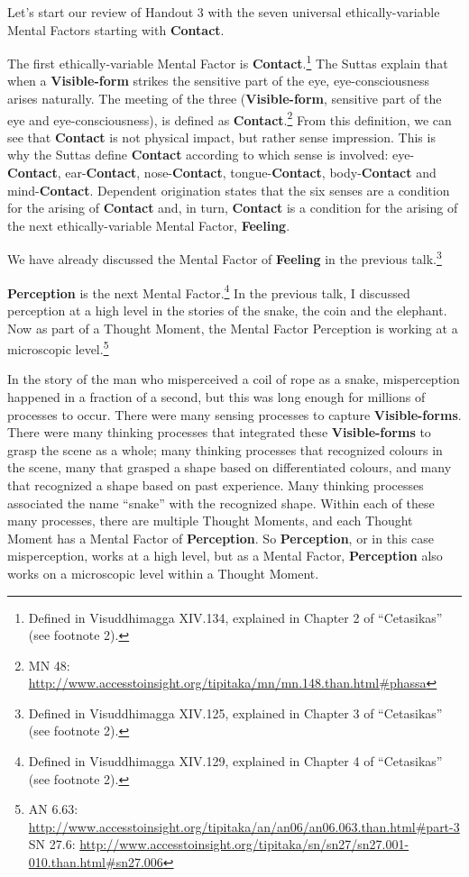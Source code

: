 Let’s start our review of Handout 3 with the seven universal ethically-variable Mental Factors starting with \textbf{Contact}.

The first ethically-variable Mental Factor is \textbf{Contact}.\footnote{Defined in Visuddhimagga XIV.134, explained in Chapter 2 of “Cetasikas” (see footnote 2).} The Suttas explain that when a \textbf{Visible-form} strikes the sensitive part of the eye, eye-consciousness arises naturally. The meeting of the three (\textbf{Visible-form}, sensitive part of the eye and eye-consciousness), is defined as \textbf{Contact}.\footnote{MN 48: \url{http://www.accesstoinsight.org/tipitaka/mn/mn.148.than.html\#phassa}} From this definition, we can see that \textbf{Contact} is not physical impact, but rather sense impression. This is why the Suttas define \textbf{Contact} according to which sense is involved: eye-\textbf{Contact}, ear-\textbf{Contact}, nose-\textbf{Contact}, tongue-\textbf{Contact}, body-\textbf{Contact} and mind-\textbf{Contact}. Dependent origination states that the six senses are a condition for the arising of \textbf{Contact} and, in turn, \textbf{Contact} is a condition for the arising of the next ethically-variable Mental Factor, \textbf{Feeling}.

We have already discussed the Mental Factor of \textbf{Feeling} in the previous talk.\footnote{Defined in Visuddhimagga XIV.125, explained in Chapter 3 of “Cetasikas” (see footnote 2).}

\textbf{Perception} is the next Mental Factor.\footnote{Defined in Visuddhimagga XIV.129, explained in Chapter 4 of “Cetasikas” (see footnote 2).} In the previous talk, I discussed perception at a high level in the stories of the snake, the coin and the elephant. Now as part of a Thought Moment, the Mental Factor Perception is working at a microscopic level.\footnote{AN 6.63: \url{http://www.accesstoinsight.org/tipitaka/an/an06/an06.063.than.html\#part-3}\\SN 27.6: \url{http://www.accesstoinsight.org/tipitaka/sn/sn27/sn27.001-010.than.html\#sn27.006}}

In the story of the man who misperceived a coil of rope as a snake, misperception happened in a fraction of a second, but this was long enough for millions of processes to occur. There were many sensing processes to capture \textbf{Visible-forms}. There were many thinking processes that integrated these \textbf{Visible-forms} to grasp the scene as a whole; many thinking processes that recognized colours in the scene, many that grasped a shape based on differentiated colours, and many that recognized a shape based on past experience. Many thinking processes associated the name “snake” with the recognized shape. Within each of these many processes, there are multiple Thought Moments, and each Thought Moment has a Mental Factor of \textbf{Perception}. So \textbf{Perception}, or in this case misperception, works at a high level, but as a Mental Factor, \textbf{Perception} also works on a microscopic level within a Thought Moment.

